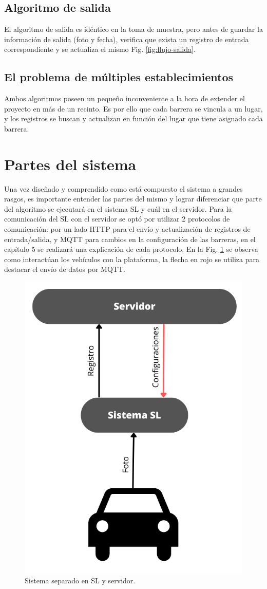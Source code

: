 \subsection{Algoritmo de salida}

El algoritmo de salida es idéntico en la toma de muestra, pero antes de guardar la información de salida (foto y fecha), verifica que exista un registro de entrada correspondiente y se actualiza el mismo Fig. \ref{fig:flujo-salida}.

\subsection{El problema de múltiples establecimientos}

Ambos algoritmos poseen un pequeño inconveniente a la hora de extender el proyecto en más de un recinto. Es por ello que cada barrera se vincula a un lugar, y los registros se buscan y actualizan en función del lugar que tiene asignado cada barrera.

\section{Partes del sistema}

Una vez diseñado y comprendido como está compuesto el sistema a grandes rasgos, es importante entender las partes del mismo y lograr diferenciar que parte del algoritmo se ejecutará en el sistema SL y cuál en el servidor. Para la comunicación del SL con el servidor se optó por utilizar 2 protocolos de comunicación: por un lado HTTP para el envío y actualización de registros de entrada/salida, y MQTT para cambios en la configuración de las barreras, en el capítulo 5 se realizará una explicación de cada protocolo.
En la Fig. \ref{fig:sistema-server-barrera} se observa como interactúan los vehículos con la plataforma, la flecha en rojo se utiliza para destacar el envío de datos por MQTT.

\begin{figure}[bth]
    \centering
    \includegraphics[width=.3\textwidth]{imgs/sistema-server-barrera}
    \caption{Sistema separado en SL y servidor.}
    \label{fig:sistema-server-barrera}
\end{figure}

